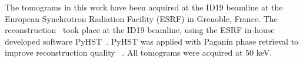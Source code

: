 The tomograms in this work have been acquired at the ID19 beamline at the
European Synchrotron Radiation Facility (ESRF) in Grenoble, France. The
reconstruction~\cite{sporring} took place at the ID19 beamline, using the ESRF
in-house developed software PyHST~\cite{NELDAM2015682,pyhst}. PyHST was applied
with Paganin phase retrieval to improve reconstruction quality
~\cite{MIRONE201441}. All tomograms were acquired at 50 keV.


